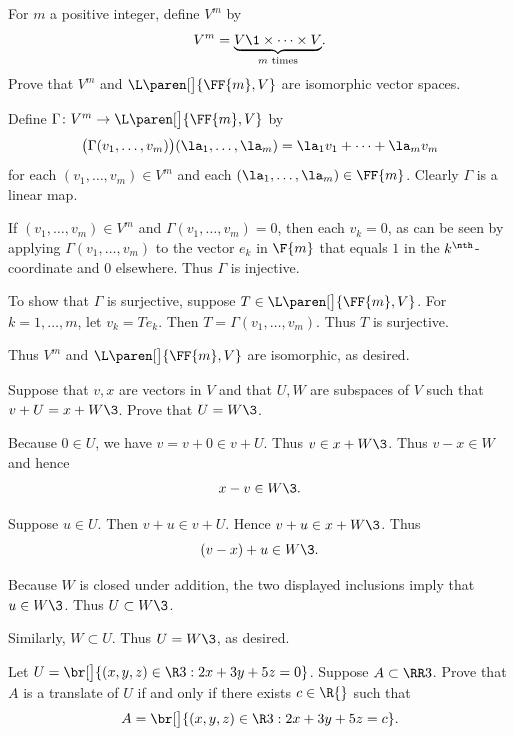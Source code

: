 \exercise
For $m$ a positive integer, define $V^m$ by
\[
V^m = \underbrace{V\1 \times \dots \times V}_{m \text{\ times}}\!.
\]
Prove that $V^m$ and $\L\paren[\big]{\FF{m}, V}$ are isomorphic vector spaces.

\begin{Solution}
Define $\Gamma \colon V^m \to \L\paren[\big]{\FF{m}, V}$ by
\[
\bigl( \Gamma(v_1, \dots, v_m) \bigr)(\la_1, \dots, \la_m) = \la_1 v_1 + \dots + \la_m v_m
\]
for each $(v_1, \dots, v_m) \in V^m$ and each $(\la_1, \dots, \la_m) \in \FF{m}$.
Clearly $\Gamma$ is a linear map.

If $(v_1, \dots, v_m) \in V^m$ and $\Gamma(v_1, \dots, v_m) = 0$, then each $v_k = 0$, as can be seen by applying $\Gamma(v_1, \dots, v_m)$ to the vector $e_k$ in $\F{m}$ that equals $1$ in the $k^\nth$-coordinate and $0$ elsewhere. Thus $\Gamma$ is injective.

To show that $\Gamma$ is surjective, suppose $T \in \L\paren[\big]{\FF{m}, V}$. For $k = 1, \dots, m$, let $v_k = Te_k$. Then $T = \Gamma(v_1, \dots, v_m)$. Thus $T$ is surjective.

Thus $V^m$ and $\L\paren[\big]{\FF{m}, V}$ are isomorphic, as desired.
\end{Solution}

\exercise
Suppose that $v, x$ are vectors in $V$ and that $U, W$ are subspaces of $V$ such that $v + U = x + W\3$. Prove that $U = W\3$.

\begin{Solution}
Because $0 \in U$, we have $v = v + 0 \in v + U$. Thus $v \in x + W\3$. Thus $v - x \in W$ and hence
\[
x - v \in W\3.
\]

Suppose $u \in U$. Then $v + u \in v + U$. Hence $v + u \in x + W\3$. Thus
\[
(v - x) + u \in W\3.
\]

Because $W$ is closed under addition, the two displayed inclusions imply that $u \in W\3$. Thus $U \subset W\3$.

Similarly, $W \subset U$. Thus $U = W\3$, as desired.
\end{Solution}

\exercise
Let $U = \br[\big]{ (x, y, z) \in \R3: 2x + 3y + 5z= 0}$. Suppose $A \subset \RR3$. Prove that $A$ is a translate of $U$ if and only if there exists $c \in \R{}$ such that\label{3translates}
\[
A = \br[\big]{ (x, y, z) \in \R3: 2x + 3y + 5z= c}.
\]
\exercisedisplayend

